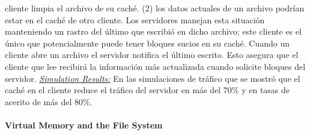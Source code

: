 cliente limpia el archivo de su caché. (2) los datos actuales de un archivo podrían estar en el caché de otro cliente. Los servidores manejan esta situación manteniendo un rastro del último que escribió en dicho archivo; este cliente es el único que potencialmente puede tener bloques sucios en su caché. Cuando un cliente abre un archivo el servidor notifica el último escrito. Esto asegura que el cliente que lee recibirá la información más actualizada cuando solicite bloques del servidor. \underline{\emph{Simulation Results:}} En las simulaciones de tráfico que se mostró que el caché en el cliente reduce el tráfico del servidor en más del 70\% y en tasas de acerito de más del 80\%.

\paragraph{\textnormal{\textbf{Virtual Memory and the File System}}}
